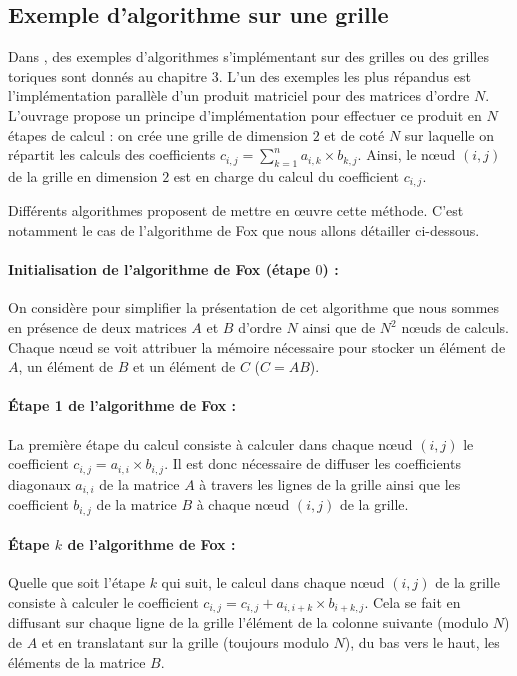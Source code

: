 \subsection{Exemple d'algorithme sur une grille}

Dans \cite{Leighton1992}, des exemples d'algorithmes s'implémentant sur des grilles ou des grilles toriques sont donnés au chapitre 3. L'un des exemples les plus répandus est l'implémentation parallèle d'un produit matriciel pour des matrices d'ordre $N$. L'ouvrage propose un principe d'implémentation pour effectuer ce produit en $N$ étapes de calcul : on crée une grille de dimension $2$ et de coté $N$ sur laquelle on répartit les calculs des coefficients $c_{i,j} = \sum\limits_{k=1}^n a_{i,k} \times b_{k,j}$. Ainsi, le nœud $(i,j)$ de la grille en dimension $2$ est en charge du calcul du coefficient $c_{i,j}$.

Différents algorithmes proposent de mettre en œuvre cette méthode. C'est notamment le cas de l'algorithme de Fox que nous allons détailler ci-dessous.

\paragraph{Initialisation de l'algorithme de Fox (étape $0$) :} On considère pour simplifier la présentation de cet algorithme que nous sommes en présence de deux matrices $A$ et $B$ d'ordre $N$ ainsi que de $N^2$ nœuds de calculs. Chaque nœud se voit attribuer la mémoire nécessaire pour stocker un élément de $A$, un élément de $B$ et un élément de $C$ ($C = AB$). 

\paragraph{Étape 1 de l'algorithme de Fox :} La première étape du calcul consiste à calculer dans chaque nœud $(i,j)$ le coefficient $c_{i,j} = a_{i,i}\times b_{i,j}$. Il est donc nécessaire de diffuser les coefficients diagonaux $a_{i,i}$ de la matrice $A$ à travers les lignes de la grille ainsi que les coefficient $b_{i,j}$ de la matrice $B$ à chaque nœud $(i,j)$ de la grille.

\paragraph{Étape $k$ de l'algorithme de Fox :} Quelle que soit l'étape $k$ qui suit, le calcul dans chaque nœud $(i,j)$ de la grille consiste à calculer le coefficient $c_{i,j} = c_{i,j} + a_{i,i+k}\times b_{i+k,j}$. Cela se fait en diffusant sur chaque ligne de la grille l'élément de la colonne suivante (modulo $N$) de $A$ et en translatant sur la grille (toujours modulo $N$), du bas vers le haut, les éléments de la matrice $B$.

